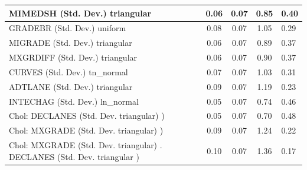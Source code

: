 \begin{table}
\begin{center}
\begin{tabular}{|l|l|c|c|c|l|}
			\hline
			MIMEDSH (Std. Dev.) triangular &  & 0.06 & 0.07 & 0.85 & 0.40 \\
			\hline
			GRADEBR (Std. Dev.) uniform &  & 0.08 & 0.07 & 1.05 & 0.29 \\
			\hline
			MIGRADE (Std. Dev.) triangular &  & 0.06 & 0.07 & 0.89 & 0.37 \\
			\hline
			MXGRDIFF (Std. Dev.) triangular &  & 0.06 & 0.07 & 0.90 & 0.37 \\
			\hline
			CURVES (Std. Dev.) tn_normal &  & 0.07 & 0.07 & 1.03 & 0.31 \\
			\hline
			ADTLANE (Std. Dev.) triangular &  & 0.09 & 0.07 & 1.19 & 0.23 \\
			\hline
			INTECHAG (Std. Dev.) ln_normal &  & 0.05 & 0.07 & 0.74 & 0.46 \\
			\hline
			 Chol: DECLANES (Std. Dev. triangular) ) &  & 0.05 & 0.07 & 0.70 & 0.48 \\
			\hline
			 Chol: MXGRADE (Std. Dev. triangular) ) &  & 0.09 & 0.07 & 1.24 & 0.22 \\
			\hline
			 Chol: MXGRADE (Std. Dev. triangular) . DECLANES (Std. Dev.   triangular ) &  & 0.10 & 0.07 & 1.36 & 0.17 \\
			\hline
		\end{tabular}
	\end{center}
\end{table}